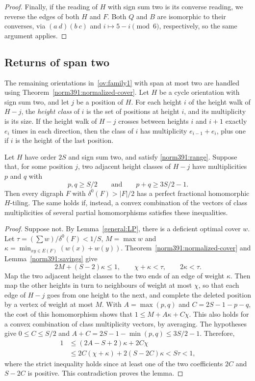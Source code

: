 \begin{proof}
Finally, if the reading of $H$ with sign sum two is its converse reading, we reverse the edges of both $H$ and $F$. Both $Q$ and $B$ are isomorphic to their converses, via $(a\ d)(b\ c)$ and
$i\mapsto5-i\pmod6$, respectively, so the same argument applies.
\end{proof}

\subsection{Returns of span two}

The remaining orientations in~\ref{ov:family1} with span at most two are handled using Theorem~\ref{norm391:normalized-cover}.
Let $H$ be a cycle orientation with sign sum two, and let $j$ be a position of $H$. For each height $i$ of the height walk of $H-j$, the \emph{height class} of $i$ is the set of positions at height $i$, and its multiplicity is its size. If the height walk of $H-j$ crosses between heights $i$ and $i+1$ exactly $e_i$ times in each direction, then the class of $i$ has multiplicity $e_{i-1}+e_i$, plus one if $i$ is the height of the last position.

\begin{lemma}
\label{height390:heavy-pair}
Let $H$ have order $2S$ and sign sum two, and satisfy
\eqref{norm391:range}. Suppose that, for some position $j$, two adjacent height classes of $H-j$ have multiplicities $p$ and $q$ with
\[
 p,q\ge S/2\qquad\text{and}\qquad p+q\ge3S/2-1.
\]
Then every digraph $F$ with $\delta^0(F)>|F|/2$ has a perfect fractional homomorphic
$H$-tiling. The same holds if, instead, a convex combination of the vectors of class multiplicities of several partial homomorphisms satisfies these inequalities.
\end{lemma}
\begin{proof}
Suppose not. By Lemma~\ref{general:LP}, there is a deficient optimal cover $w$. Let
$\tau=(\sum w)/\delta^0(F)<1/S$, $M=\max w$ and
$\kappa=\min_{xy\in E(F)}(w(x)+w(y))$.
Theorem~\ref{norm391:normalized-cover} and
Lemma~\ref{norm391:savings} give
\[
 2M+(S-2)\kappa\le1,\qquad
 \chi+\kappa<\tau,\qquad 2\kappa<\tau.
\]
Map the two adjacent height classes to the two ends of an edge of weight $\kappa$. Then map the other heights in turn to neighbours of weight at most $\chi$, so that each edge of $H-j$ goes from one height to the next, and complete the deleted position by a vertex of weight
at most $M$. With $A=\max(p,q)$ and $C=2S-1-p-q$, the cost of this homomorphism shows that $1\le M+A\kappa+C\chi$. This also holds for a convex combination of class multiplicity vectors, by averaging.
The hypotheses give $0\le C\le S/2$ and
$A+C=2S-1-\min(p,q)\le3S/2-1$. Therefore,
\[
\begin{split}
 1&\le(2A-S+2)\kappa+2C\chi\\
  &\le2C(\chi+\kappa)+2(S-2C)\kappa
   <S\tau<1,
\end{split}
\]
where the strict inequality holds since at least one of the two coefficients $2C$ and $S-2C$ is positive. This contradiction proves the lemma.
\end{proof}

